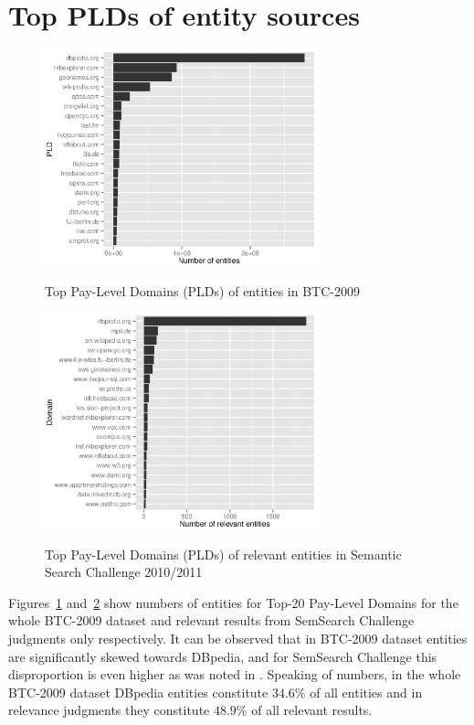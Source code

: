 \documentclass{article}
\begin{document}
\section{Top PLDs of entity sources}

\begin{figure}[!tbp]
  \caption{Top Pay-Level Domains (PLDs) of entities in BTC-2009}
  \centering
  \includegraphics[width=0.7\textwidth]{../btc-2009}
  \label{fig:btc2009}
\end{figure}
\begin{figure}[!tbp]
  \caption{Top Pay-Level Domains (PLDs) of relevant entities in Semantic Search
    Challenge 2010/2011}
  \centering
  \includegraphics[width=0.7\textwidth]{../relevant}
  \label{fig:relevant}
\end{figure}

Figures~\ref{fig:btc2009} and~\ref{fig:relevant} show numbers of entities for
Top-20 Pay-Level Domains for the whole BTC-2009 dataset and relevant results
from SemSearch Challenge judgments only respectively. It can be observed that in
BTC-2009 dataset entities are significantly skewed towards DBpedia, and for
SemSearch Challenge this disproportion is even higher as was noted in
\cite{balog2013test}. Speaking of numbers, in the whole BTC-2009 dataset
DBpedia entities constitute $34.6\%$ of all entities and in relevance judgments
they constitute $48.9\%$ of all relevant results.
\end{document}

